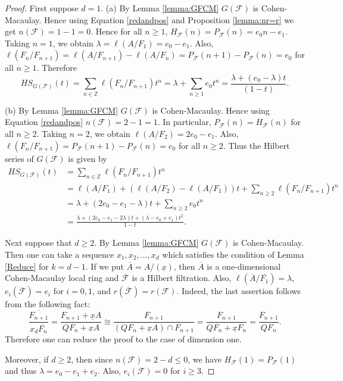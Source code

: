 \documentclass[12pt]{amsart}
\theoremstyle{definition}
\theoremstyle{remark}
\numberwithin{equation}{section}
\newcommand{\FF}{\mathcal{F}}
\begin{document}
\begin{proof}
First suppose $d=1$. 
{(a)} By Lemma \ref{lemma:GFCM} $G(\FF)$ is Cohen-Macaulay. 
Hence using Equation \eqref{redandpos} and Proposition \ref{lemma:nr=r}
 we get $n(\FF) = 1-1 = 0$. Hence for all $n \geq 1$, $H_{\FF}(n)=P_{\FF}(n) = e_0n-e_1$. 
Taking $n=1$, we obtain $\lambda= \ell(A/F_1) = e_0 -e_1$.
Also,
$\ell(F_n/F_{n+1})= \ell(A/F_{n+1})-\ell(A/F_n)=P_{\FF}(n+1)-P_{\FF}(n)=e_0$ 
for all  $n \geq 1$.
Therefore
\[
HS_{G(\FF)}(t) = \sum_{n\in \mathbb{Z}} \ell(F_n/F_{n+1})t^n
=\lambda +\sum_{n\geq 1} e_0 t^n = \frac{\lambda + (e_0-\lambda)t}{(1-t)}.
\]
\par \noindent
{(b)} By Lemma \ref{lemma:GFCM} $G(\FF)$ is Cohen-Macaulay. 
Hence using Equation \eqref{redandpos} $n(\FF) = 2-1 =1$. 
In particular, $P_{\FF}(n) = H_{\FF}(n)$ for all $n \geq 2$.  
Taking $n =2$, we obtain $\ell(A/F_2) = 2e_0 -e_1$.
Also, $\ell(F_n/F_{n+1})=P_{\FF}(n+1)-P_{\FF}(n)=e_0$ for all $n \geq 2$.
Thus the Hilbert series of $G(\FF)$ is given by
\begin{equation*}
\begin{split}
 HS_{G(\FF)}(t) 
& =  \sum_{n\in \mathbb{Z}} \ell(F_n/F_{n+1})t^n \\
& = \ell(A/F_1) + (\ell(A/F_2)-\ell(A/F_1))t 
+ \sum_{n\geq 2} \ell(F_n/F_{n+1})t^n \\
& = \lambda +(2e_0-e_1-\lambda)t  + \sum_{n \geq 2} e_0 t^n \\
& = \frac{\lambda + (2e_0-e_1-2\lambda)t +(\lambda-e_0+e_1)t^2}{1-t}. 
\end{split} 
\end{equation*}

\par \vspace{2mm}
Next suppose that $d \ge 2$.  
By Lemma \ref{lemma:GFCM} $G(\FF)$ is Cohen-Macaulay. 
Then one can take a sequence $x_1,x_2,\ldots,x_d$ which satisfies 
the condition of Lemma \ref{Reduce} for $k=d-1$. 
If we put $\overline{A}=A/(\underline{x})$, then $\overline{A}$ is a one-dimensional Cohen-Macaulay local ring and $\overline{\FF}$ is 
a Hilbert filtration. 
Also, $\ell(\overline{A}/\overline{F_1})=\lambda$,  
$e_i(\overline{\FF})=e_i$ for $i=0,1$, and $r(\overline{\FF})=r(\FF)$. 
Indeed, the last assertion follows from the following fact: 
\begin{equation} \label{Red_rf}
\dfrac{\overline{F_{n+1}}}{x_d \overline{F_n}} 
= \dfrac{F_{n+1}+\underline{x}A}{QF_n+\underline{x}A} 
\cong  \dfrac{F_{n+1}}{(QF_n+\underline{x}A)\cap F_{n+1}} 
= \dfrac{F_{n+1}}{QF_n+\underline{x} F_{n}} =\dfrac{F_{n+1}}{QF_n}. 
\end{equation}
Therefore one can reduce the proof to the case of dimension one. 
\par 
Moreover, if $d \ge 2$, then since $n(\FF) = 2-d \le 0$, 
we have $H_{\FF}(1)=P_{\FF}(1)$ and thus $\lambda=e_0-e_1+e_2$. 
Also, $e_i(\FF)=0$ for $i \ge 3$. 
\end{proof}
\end{document}
